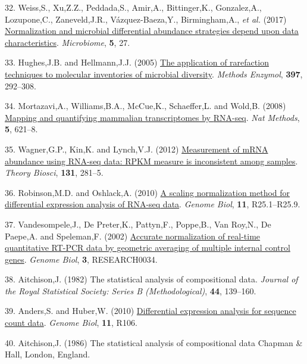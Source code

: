 \documentclass[
]{article}
\newlength{\cslhangindent}
\newenvironment{CSLReferences}[2] %
 {\begin{list}{}{%
  \setlength{\itemindent}{0pt}
  \setlength{\leftmargin}{0pt}
  \setlength{\parsep}{0pt}
  \ifodd #1
   \setlength{\leftmargin}{\cslhangindent}
   \setlength{\itemindent}{-1\cslhangindent}
  \fi
  \setlength{\itemsep}{#2\baselineskip}}}
 {\end{list}}
\begin{document}
\begin{CSLReferences}{1}{1}
32. Weiss,S., Xu,Z.Z., Peddada,S., Amir,A., Bittinger,K., Gonzalez,A.,
Lozupone,C., Zaneveld,J.R., Vázquez-Baeza,Y., Birmingham,A., \emph{et
al.} (2017)
\href{https://doi.org/10.1186/s40168-017-0237-y}{Normalization and
microbial differential abundance strategies depend upon data
characteristics}. \emph{Microbiome}, \textbf{5}, 27.

33. Hughes,J.B. and Hellmann,J.J. (2005)
\href{https://doi.org/10.1016/S0076-6879(05)97017-1}{The application of
rarefaction techniques to molecular inventories of microbial diversity}.
\emph{Methods Enzymol}, \textbf{397}, 292--308.

34. Mortazavi,A., Williams,B.A., McCue,K., Schaeffer,L. and Wold,B.
(2008) \href{https://doi.org/10.1038/nmeth.1226}{Mapping and quantifying
mammalian transcriptomes by {RNA-seq}}. \emph{Nat Methods}, \textbf{5},
621--8.

35. Wagner,G.P., Kin,K. and Lynch,V.J. (2012)
\href{https://doi.org/10.1007/s12064-012-0162-3}{Measurement of mRNA
abundance using RNA-seq data: RPKM measure is inconsistent among
samples}. \emph{Theory Biosci}, \textbf{131}, 281--5.

36. Robinson,M.D. and Oshlack,A. (2010)
\href{https://doi.org/10.1186/gb-2010-11-3-r25}{A scaling normalization
method for differential expression analysis of {RNA-seq} data}.
\emph{Genome Biol}, \textbf{11}, R25.1--R25.9.

37. Vandesompele,J., De Preter,K., Pattyn,F., Poppe,B., Van Roy,N., De
Paepe,A. and Speleman,F. (2002)
\href{https://www.ncbi.nlm.nih.gov/pubmed/12184808}{Accurate
normalization of real-time quantitative RT-PCR data by geometric
averaging of multiple internal control genes}. \emph{Genome Biol},
\textbf{3}, RESEARCH0034.

38. Aitchison,J. (1982) The statistical analysis of compositional data.
\emph{Journal of the Royal Statistical Society: Series B
(Methodological)}, \textbf{44}, 139--160.

39. Anders,S. and Huber,W. (2010)
\href{https://doi.org/10.1186/gb-2010-11-10-r106}{Differential
expression analysis for sequence count data}. \emph{Genome Biol},
\textbf{11}, R106.

40. Aitchison,J. (1986) The statistical analysis of compositional data
Chapman \& Hall, London, England.


\end{CSLReferences}
\end{document}
